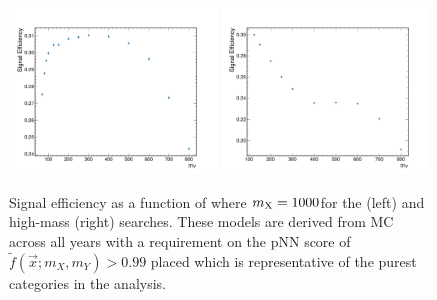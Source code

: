 \begin{figure}
  \centering
  \includegraphics[width=0.49\textwidth]{Figures/Dihiggs/signal/shape_change/y_tautau_sigeff.pdf}
  \includegraphics[width=0.49\textwidth]{Figures/Dihiggs/signal/shape_change/y_gg_high_mass_my_sigeff.pdf}
  \caption[Signal Efficiency as a Function of \mY in the \XYH Searches]{Signal efficiency as a function of \mY where $m_{\mathrm{X}}=1000$\GeV for the \XYttHgg (left) and high-mass \XYttHgg (right) searches. These models are derived from MC across all years with a requirement on the pNN score of $\tilde{f}(\vec{x};m_X,m_Y)>0.99$ placed which is representative of the purest categories in the analysis.}\label{fig:sigeff_change_2d}
\end{figure}

